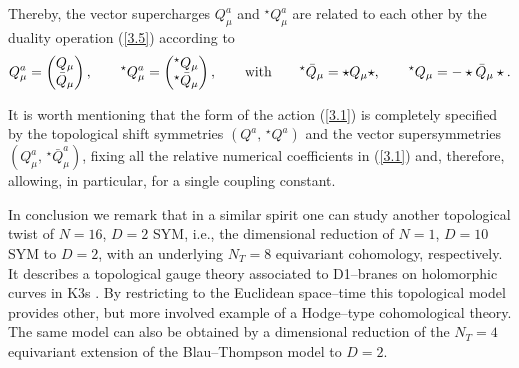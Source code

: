 \documentclass[a4paper,11pt]{article}
\begin{document}
Thereby, the vector supercharges $Q_\mu^a$ and $^\star Q_\mu^a$ are related 
to each other by the duality operation (\ref{3.5}) according to
\begin{equation*}
Q_\mu^a = \begin{pmatrix} Q_\mu \\ \bar{Q}_\mu \end{pmatrix},
\qquad
^\star Q_\mu^a = \begin{pmatrix} ^\star Q_\mu \\ ^\star \bar{Q}_\mu 
\end{pmatrix},
\qquad
\hbox{with}
\qquad
^\star \bar{Q}_\mu = \star Q_\mu \star,
\qquad
^\star Q_\mu = - \star \bar{Q}_\mu \star.
\end{equation*}

It is worth mentioning that the form of the action (\ref{3.1}) is completely 
specified by the topological shift symmetries $(Q^a, \,^\star Q^a)$ and the 
vector supersymmetries $(Q_\mu^a, \,^\star \bar{Q}_\mu^a)$, fixing all the 
relative numerical coefficients in (\ref{3.1}) and, therefore, allowing, 
in particular, for a single coupling constant.

In conclusion we remark that in a similar spirit 
one can study another topological twist of $N = 16$, $D = 2$ SYM, i.e., 
the dimensional reduction of $N = 1$, $D = 10$ SYM to $D = 2$, with an 
underlying $N_T = 8$ equivariant cohomology, respectively. 
It describes a topological gauge theory associated to D1--branes on 
holomorphic curves in K3s \cite{16}. By restricting to the Euclidean 
space--time this topological model provides other, but more 
involved example of a Hodge--type cohomological theory. The same model
can also be obtained by a dimensional reduction of the $N_T = 4$
equivariant extension of the Blau--Thompson model \cite{19} to $D = 2$. 

\end{document}
